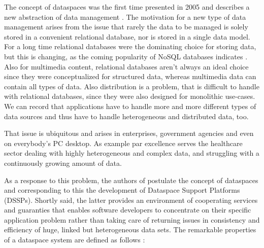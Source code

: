 The concept of dataspaces was the first time presented in 2005 and describes a new abstraction of data management \cite[p. 27]{Franklin:2005:DDN:1107499.1107502}. 
The motivation for a new type of data management arises from the issue that rarely the data to be managed is solely stored in a convenient relational database, nor is stored in a single data model.
For a long time relational databases were the dominating choice for storing data, but this is changing, as the coming popularity of NoSQL databases indicates \cite{SQL_NOSQL_DATABASES}. Also for multimedia content, relational databases aren't always an ideal choice since they were conceptualized for structured data, whereas multimedia data can contain all types of data. Also distribution is a problem, that is difficult to handle with relational databases, since they were also designed for monolithic use-cases.
We can record that applications have to handle more and more different types of data sources and thus have to handle heterogeneous and distributed data, too.

That issue is ubiquitous and arises in enterprises, government agencies and even on everybody's PC desktop. As example par excellence serves the healthcare sector dealing with highly heterogeneous and complex data, and struggling with a continuously growing amount of data.

As a response to this problem, the authors of \cite{Franklin:2005:DDN:1107499.1107502} postulate the concept of dataspaces and corresponding to this the  development of Dataspace Support Platforms (DSSPs). Shortly said, the latter provides an environment of cooperating services and guaranties that enables software developers to concentrate on their specific application problem rather than taking care of returning issues in consistency and efficiency of huge, linked but heterogeneous data sets. The remarkable properties of a dataspace system are defined as follows \cite[p. 28]{Franklin:2005:DDN:1107499.1107502}:

